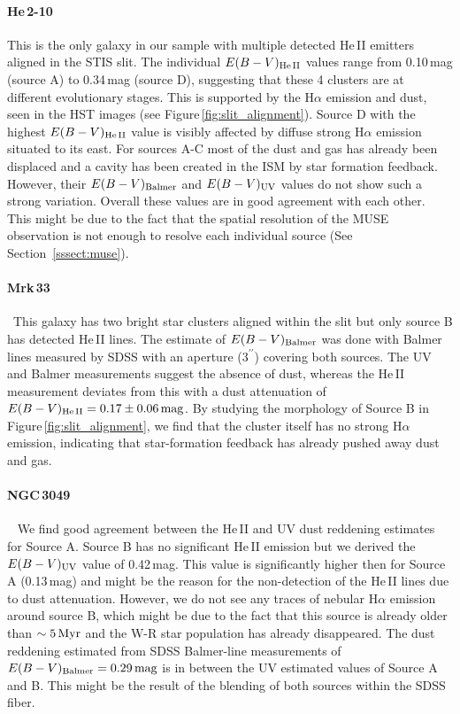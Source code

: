 \documentclass[]{aastex63}
\begin{document}
\paragraph{He\,2-10~}
This is the only galaxy in our sample with multiple detected He\,II emitters aligned in the STIS slit. The individual ${E(B-V)_{\rm He\,II}}$ values range from 0.10\,mag (source A) to 0.34\,mag (source D), suggesting that these 4 clusters are at different evolutionary stages. This is supported by the H$\alpha$ emission and dust, seen in the HST images (see Figure\,\ref{fig:slit_alignment}). Source D with the highest ${E(B-V)_{\rm He\,II}}$ value is visibly affected by diffuse strong H$\alpha$ emission situated to its east. For sources A-C most of the dust and gas has already been displaced and a cavity has been created in the ISM by star formation feedback. However, their ${E(B-V)_{\rm Balmer}}$ and ${E(B-V)_{\rm UV}}$ values do not show such a strong variation. Overall these values are in good agreement with each other. This might be due to the fact that the spatial resolution of the MUSE observation is not enough to resolve each individual source (See Section~\ref{sssect:muse}).


\paragraph{Mrk\,33~}~This galaxy has two bright star clusters aligned within the slit but only source B has detected He\,II lines. The estimate of ${E(B-V)_{\rm Balmer}}$ was done with Balmer lines measured by SDSS with an aperture ($3^{\prime\prime}$) covering both sources. The UV and Balmer measurements suggest the absence of dust, whereas the He\,II measurement deviates from this with a dust attenuation of $E(B-V)_{\rm He\,II} = 0.17\pm0.06\,{\rm mag}$. By studying the morphology of Source B in Figure\,\ref{fig:slit_alignment}, we find that the cluster itself has no strong H$\alpha$ emission, indicating that star-formation feedback has already pushed away dust and gas. 

\paragraph{NGC\,3049~}~
We find good agreement between the He\,II and UV dust reddening estimates for Source A. Source B has no significant He\,II emission but we derived the $E(B-V)_{\rm UV}$ value of 0.42\,mag. This value is significantly higher then for Source A (0.13\,mag) and might be the reason for the non-detection of the He\,II lines due to dust attenuation. However, we do not see any traces of nebular H$\alpha$ emission around source B, which might be due to the fact that this source is already older than $\sim5\,{\rm Myr}$ and the W-R star population has already disappeared.  
The dust reddening estimated from SDSS Balmer-line measurements of $E(B-V)_{\rm Balmer}=0.29\,{\rm mag}$ is in between the UV estimated values of Source A and B. This might be the result of the blending of both sources within the SDSS fiber.
\end{document}
